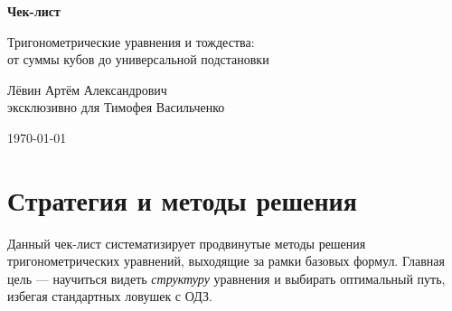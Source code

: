 \documentclass[a4paper,12pt]{article}
\begin{document}
\begin{titlepage}
    \centering
    \vspace*{2cm}
    
    {\Huge\bfseries\color{darkaccent} Чек-лист\par}
    \vspace{0.5cm}
    {\LARGE\color{accent} Тригонометрические уравнения и тождества: \\[0.3cm]
    от суммы кубов до универсальной подстановки\par}
    
    \vfill
    
    {\Large\color{textgray} Лёвин Артём Александрович \\[0.2cm]
    эксклюзивно для Тимофея Васильченко\par}
    
    \vspace{1cm}
    
    {\large\today\par}
    
    \vfill
    
    \vspace*{1cm}
\end{titlepage}

\section*{Стратегия и методы решения}

Данный чек-лист систематизирует продвинутые методы решения тригонометрических уравнений, выходящие за рамки базовых формул. Главная цель --- научиться видеть \textit{структуру} уравнения и выбирать оптимальный путь, избегая стандартных ловушек с ОДЗ.
\end{document}
